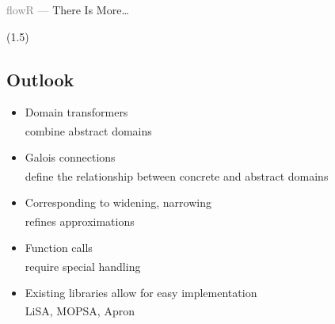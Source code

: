 \begin{frame}[fragile]{\textcolor{gray}{flowR ---} There Is More\ldots}
\begin{onlyenv}
\begin{center}
\end{center}
\end{onlyenv}
(1.5)%
\end{frame}

\fi

\color{black}


\subsection{Outlook}
\begin{frame}{\insertsection}
   \begin{itemize}[<+(1)->]
      \itemsep8pt
      \item Domain transformers\\
         \color{gray}combine abstract domains\textsuperscript{\cite[149]{DBLP:journals/ftpl/Mine17}}
      \item Galois connections\\
         \color{gray}define the relationship between concrete and abstract domains\textsuperscript{\cite[110]{cousout2021principles}}
      \item Corresponding to widening, narrowing\\
      \color{gray}refines approximations\textsuperscript{\cite[395]{cousout2021principles}}
      \item Function calls\\
      \color{gray}require special handling\textsuperscript{\cite{DBLP:journals/iandc/MidtgaardJ12}}
      \item Existing libraries allow for easy implementation\\
      \color{gray}LiSA\textsuperscript{\cite{DBLP:conf/pldi/FerraraNAC21}}, MOPSA\textsuperscript{\cite{DBLP:conf/vstte/JournaultMMO19}}, Apron\textsuperscript{\cite{DBLP:conf/cav/JeannetM09}}
   \end{itemize}
\end{frame}






